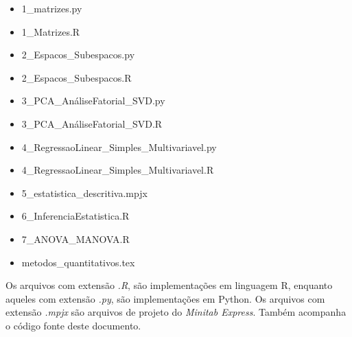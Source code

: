 \documentclass{article}
\begin{document}
\begin{itemize}
    \item  1\_matrizes.py
    \item  1\_Matrizes.R
    \item  2\_Espacos\_Subespacos.py
    \item  2\_Espacos\_Subespacos.R
    \item  3\_PCA\_AnáliseFatorial\_SVD.py
    \item  3\_PCA\_AnáliseFatorial\_SVD.R
    \item  4\_RegressaoLinear\_Simples\_Multivariavel.py
    \item  4\_RegressaoLinear\_Simples\_Multivariavel.R
    \item  5\_estatistica\_descritiva.mpjx
    \item  6\_InferenciaEstatistica.R
    \item  7\_ANOVA\_MANOVA.R
    \item  metodos\_quantitativos.tex
\end{itemize}

Os arquivos com extensão \emph{.R}, são implementações em linguagem R, enquanto aqueles com extensão \emph{.py}, são implementações em Python. Os arquivos com extensão \emph{.mpjx} são arquivos de projeto do \emph{Minitab Express}. Também acompanha o código fonte deste documento.
\end{document}
